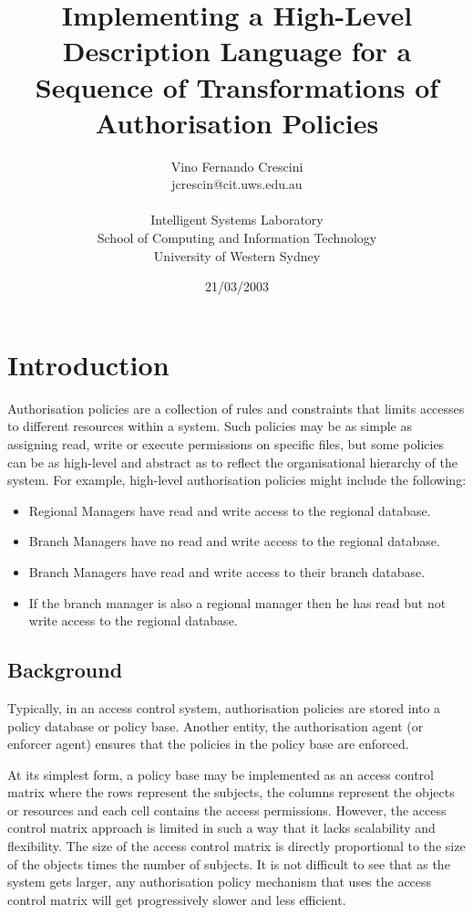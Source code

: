 \documentclass[a4paper]{article}
\author{Vino Fernando Crescini\\jcrescin@cit.uws.edu.au\\\\Intelligent Systems Laboratory\\School of Computing and Information Technology\\University of Western Sydney}
\title{Implementing a High-Level Description Language for a Sequence of Transformations of Authorisation Policies}
\date{21/03/2003}
\begin{document}
  \maketitle
  \section{Introduction}

    Authorisation policies are a collection of rules and constraints that 
    limits accesses to different resources within a system. Such policies may 
    be as simple as assigning read, write or execute permissions on specific 
    files, but some policies can be as high-level and abstract as to reflect 
    the organisational hierarchy of the system. For example, high-level 
    authorisation policies might include the following:

    \begin{itemize}
      \item
        Regional Managers have read and write access to the regional database.
      \item
        Branch Managers have no read and write access to the regional database.
      \item 
        Branch Managers have read and write access to their branch database.
      \item 
         If the branch manager is also a regional manager then he has read
         but not write access to the regional database.
    \end{itemize}

    \subsection{Background}

      Typically, in an access control system, authorisation policies are stored
      into a policy database or policy base. Another entity, the authorisation
      agent (or enforcer agent) ensures that the policies in the policy base
      are enforced. 

      At its simplest form, a policy base may be implemented as an access
      control matrix where the rows represent the subjects, the columns
      represent the objects or resources and each cell contains the access
      permissions. However, the access control matrix approach is limited in
      such a way that it lacks scalability and flexibility. The size of the
      access control matrix is directly proportional to the size of the objects
      times the number of subjects. It is not difficult to see that as the
      system gets larger, any authorisation policy mechanism that uses the
      access control matrix will get progressively slower and less efficient.
\end{document}
